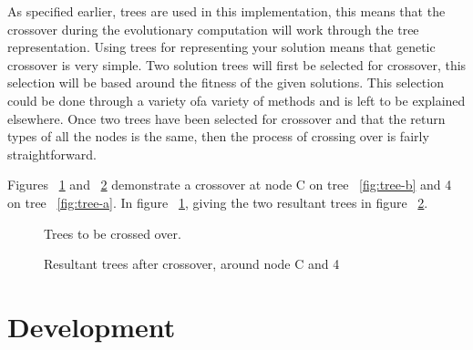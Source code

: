 \documentclass[12pt]{article}
\begin{document}
As specified earlier, trees are used in this implementation, this means that the crossover during the evolutionary computation
will work through the tree representation. Using trees for representing your solution means that genetic crossover is
very simple. Two solution trees will first be selected for crossover, this selection will be based around the fitness of the given
solutions. This selection could be done through a variety ofa variety of  methods and is left to be explained elsewhere. Once two trees
have been selected for crossover and that the return types of all the nodes is the same, then the process of crossing over
is fairly straightforward.

Figures ~\ref{fig:treesab} and ~\ref{fig:resultanttrees} demonstrate a crossover at node C on tree ~\ref{fig:tree-b} and 4 on tree ~\ref{fig:tree-a}. In
figure  ~\ref{fig:treesab}, giving the two resultant trees in figure ~\ref{fig:resultanttrees}.

\begin{figure} [ht]
\centering
\subfigure[]{\label{fig:tree-b}\Tree [.A [ D E ].B [ F G H I ].C ]}
\hfil
\subfigure[]{\label{fig:tree-a}\Tree [.1 [ 4 5 6 7 ].2 [ 8 9 ].3 ]}
\caption{Trees to be crossed over.\label{fig:treesab}}
\end{figure}

\begin{figure} [ht]
\centering
\subfigure[]{\label{fig:tree-Ra}\Tree [.A [ D E ].B 4 ]}
\hfil
{}
\caption{Resultant trees after crossover, around node C and 4 \label{fig:resultanttrees}}
\end{figure}


\section{Development}
\end{document}
